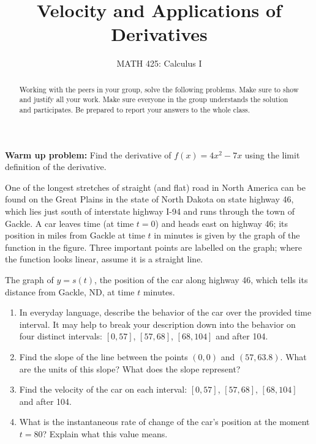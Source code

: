 \documentclass{ximera}
\title{Velocity and Applications of Derivatives}
\author{MATH 425: Calculus I}
\begin{document}
\begin{abstract}
   Working with the peers in your group, solve the following problems. Make sure to show and justify all your work. Make sure everyone in the group understands the solution and participates. Be prepared to report your answers to the whole class. 
\end{abstract}
\maketitle

\begin{exercise}
    \textbf{Warm up problem:} Find the derivative of $f(x)=4x^2-7x$ using the limit definition of the derivative.
\end{exercise}

\begin{exercise}
    One of the longest stretches of straight (and flat) road in North America can be found on the Great Plains in the state of North Dakota on state highway 46, which lies just south of interstate highway I-94 and runs through the town of Gackle.  A car leaves time (at time $t=0$) and heads east on highway 46; its position in miles from Gackle at time $t$ in minutes is given by the graph of the function in the figure.  Three important points are labelled on the graph; where the function looks linear, assume it is a straight line.
    \begin{center}
    \end{center}
    The graph of $y=s(t)$, the position of the car along highway 46, which tells its distance from Gackle, ND, at time $t$ minutes.
    \begin{enumerate}
        \item In everyday language, describe the behavior of the car over the provided time interval. It may help to break your description down into the behavior on four distinct intervals: $[0,57]$, $[57,68]$, $[68,104]$ and after 104.
        \item Find the slope of the line between the points $(0,0)$ and $(57, 63.8)$.  What are the units of this slope?  What does the slope represent?
        \item Find the velocity of the car on each interval: $[0,57]$, $[57,68]$, $[68,104]$ and after 104.
        \item What is the instantaneous rate of change of the car's position at the moment $t=80$?  Explain what this value means.
    \end{enumerate}
\end{exercise}
\end{document}
